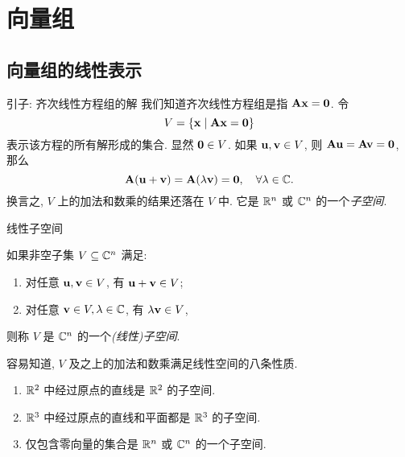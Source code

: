 \section{向量组}

\subsection{向量组的线性表示}

\begin{frame}{引子: 齐次线性方程组的解}
	\onslide<+->
	我们知道齐次线性方程组是指 ${\mathbf{A}}{\mathbf{x}}={\bf0}$.
	\onslide<+->
	令
	\[V=\{{\mathbf{x}}\mid {\mathbf{A}}{\mathbf{x}}={\bf0}\}\]
	表示该方程的所有解形成的集合.
	\onslide<+->
	显然 ${\bf0}\in V$.
	\onslide<+->
	如果 ${\mathbf{u}},{\mathbf{v}}\in V$, 则 ${\mathbf{A}}{\mathbf{u}}={\mathbf{A}}{\mathbf{v}}={\bf0}$, 那么
	\[{\mathbf{A}}({\mathbf{u}}+{\mathbf{v}})={\mathbf{A}}(\lambda {\mathbf{v}})={\bf0},\quad \forall\lambda\in{\mathbb{C}}.\]
	\onslide<+->
	换言之, $V$ 上的加法和数乘的结果还落在 $V$ 中.
	\onslide<+->
	它是 ${\mathbb{R}}^n$ 或 ${\mathbb{C}}^n$ 的一个\emph{子空间}.
\end{frame}


\begin{frame}{线性子空间}
	\onslide<+->
	\begin{definition}
		如果非空子集 $V\subseteq {\mathbb{C}}^n$ 满足:
		\begin{enumerate}
			\item 对任意 ${\mathbf{u}},{\mathbf{v}}\in V$, 有 ${\mathbf{u}}+{\mathbf{v}}\in V$;
			\item 对任意 ${\mathbf{v}}\in V,\lambda\in{\mathbb{C}}$, 有 $\lambda{\mathbf{v}}\in V$,
		\end{enumerate}
		则称 $V$ 是 ${\mathbb{C}}^n$ 的一个\emph{(线性)子空间}.
	\end{definition}
	\onslide<+->
	容易知道, $V$ 及之上的加法和数乘满足线性空间的八条性质.

	\onslide<+->
	\begin{example}
		\begin{enumerate}
			\item ${\mathbb{R}}^2$ 中经过原点的直线是 ${\mathbb{R}}^2$ 的子空间.
			\item ${\mathbb{R}}^3$ 中经过原点的直线和平面都是 ${\mathbb{R}}^3$ 的子空间. 
			\item 仅包含零向量的集合是 ${\mathbb{R}}^n$ 或 ${\mathbb{C}}^n$ 的一个子空间.
		\end{enumerate}
	\end{example}
\end{frame}



